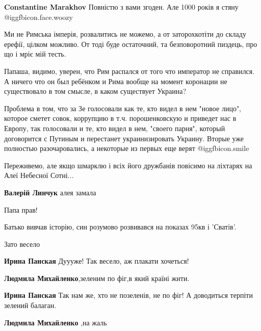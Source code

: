\begin{itemize}
\begin{itemize}
\textbf{Constantine Marakhov}
Повністю з вами згоден. Але 1000 років я стяну @igg{fbicon.face.woozy} 
\end{itemize} %


Ми не Римська імперія, розвалитись не можемо, а от заторохкотіти до складу
ерефії, цілком можливо. От тоді буде остаточний, та безповоротний пиздець, про
що і мріє мій тесть.



Папаша, видимо, уверен, что Рим распался от того что император не справился. А
ничего что он был ребёнком и Рима вообще на момент коронации не существовало в
том смысле, в каком существует Украина?



Проблема в том, что за Зе голосовали как те, кто видел в нем "новое лицо",
которое сметет совок, коррупцию в т.ч. порошенковскую и приведет нас в Европу,
так голосовали и те, кто видел в нем, "своего парня", который договорится с
Путиным и перестанет украинизировать Украину. Вторые уже полностью
разочаровались, а некоторые из первых еще верят  @igg{fbicon.smile} 


Переживемо, але якщо шмарклю і всіх його дружбанів повісимо на ліхтарях на Алеї
Небесної Сотні...

\begin{itemize} %
\textbf{Валерій Линчук} алея замала
\end{itemize} %

Папа прав!

Батько вивчав історію, син розумово розвивався на показах 95кв і 'Сватів'.

Зато весело

\begin{itemize} %
\textbf{Ирина Панская} Дуууже! Так весело, аж плакати хочеться!

\textbf{Людмила Михайленко},зеленим по фіг,в який країні жити.

\textbf{Ирина Панская} Так нам же, хто не позеленів, не по фіг! А доводиться терпіти зелений балаган.

\textbf{Людмила Михайленко} ,на жаль
\end{itemize} %


\end{itemize}
